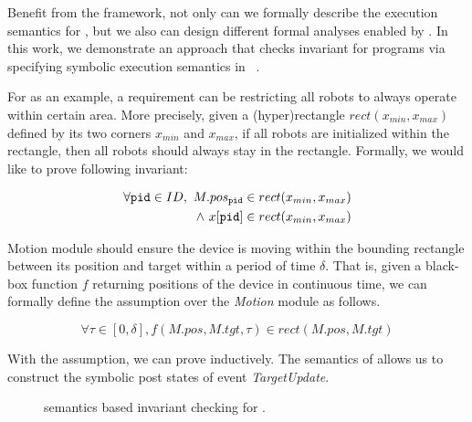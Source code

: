 Benefit from the \K framework, not only can we formally describe the execution semantics for \lgname,
but we also can design different formal analyses enabled by \K.
In this work, we demonstrate an approach that checks invariant for \lgname programs via specifying symbolic execution semantics in \K~\cite{}.

For \LineForm as an example, a requirement can be restricting all robots to always operate within certain area.
More precisely, given a (hyper)rectangle $rect(x_{min}, x_{max})$ defined by its two corners $x_{min}$ and $x_{max}$,
if all robots are initialized within the rectangle, then all robots should always stay in the rectangle.
Formally, we would like to prove following invariant:
\begin{invariant}\label{inv:lineform}
\[
\begin{split}
    \forall \texttt{pid} \in ID,\ M.pos_{\texttt{pid}} \in rect(x_{min}, x_{max}) \\
    \land\ x[\texttt{pid}] \in rect(x_{min}, x_{max})
\end{split}
\]
\end{invariant}

Motion module should ensure the device is moving within the bounding rectangle between its position and target
within a period of time $\delta$.
That is, given a black-box function $f$ returning positions of the device in continuous time,
we can formally define the assumption over the \emph{Motion} module as follows.
\begin{assumption}\label{lineform-assume}
\[
\forall \tau \in [0, \delta], f(M.pos, M.tgt, \tau) \in rect(M.pos, M.tgt)
\]
\end{assumption}

With the assumption, we can prove  inductively.
The \K semantics of \lgname allows us to construct the symbolic post states of event \emph{TargetUpdate}.

\begin{figure}
\caption{\K semantics based invariant checking for \lgname.}
\end{figure}


